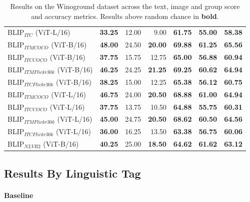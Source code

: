 \begin{table}[ht]
\begin{tabular}{l|rrr|rrr}
 BLIP$_{ITC}$ (ViT-L/16)             & \textbf{33.25} & 12.00          & 9.00           & \textbf{61.75} & \textbf{55.00} & \textbf{58.38} \\
 BLIP$_{ITM COCO}$ (ViT-B/16)        & \textbf{48.00} & 24.50          & \textbf{20.00} & \textbf{69.88} & \textbf{61.25} & \textbf{65.56} \\
 BLIP$_{ITC COCO}$ (ViT-B/16)        & \textbf{37.75} & 15.75          & 12.75          & \textbf{65.00} & \textbf{56.88} & \textbf{60.94} \\
 BLIP$_{ITM Flickr30k}$ (ViT-B/16)   & \textbf{46.25} & 24.25          & \textbf{21.25} & \textbf{69.25} & \textbf{60.62} & \textbf{64.94} \\
 BLIP$_{ITC Flickr30k}$ (ViT-B/16)   & \textbf{38.25} & 15.00          & 12.25          & \textbf{65.38} & \textbf{56.12} & \textbf{60.75} \\
 BLIP$_{ITM COCO}$ (ViT-L/16)        & \textbf{46.75} & 24.00          & \textbf{20.50} & \textbf{68.88} & \textbf{61.00} & \textbf{64.94} \\
 BLIP$_{ITC COCO}$ (ViT-L/16)        & \textbf{37.75} & 13.75          & 10.50          & \textbf{64.88} & \textbf{55.75} & \textbf{60.31} \\
 BLIP$_{ITM Flickr30k}$ (ViT-L/16)   & \textbf{45.00} & 24.75          & \textbf{20.50} & \textbf{68.62} & \textbf{60.50} & \textbf{64.56} \\
 BLIP$_{ITC Flickr30k}$ (ViT-L/16)   & \textbf{36.00} & 16.25          & 13.50          & \textbf{63.38} & \textbf{56.75} & \textbf{60.06} \\
 BLIP$_{NLVR2}$ (ViT-B/16)           & \textbf{40.25} & 25.00          & \textbf{18.50} & \textbf{64.62} & \textbf{61.62} & \textbf{63.12} \\
\bottomrule
\end{tabular}
\caption{Results on the Winoground dataset across the text, image and group score and accuracy metrics. Results above random chance in \textbf{bold}.}
\label{tab:results_aggr_ours}
\end{table}

\subsection{Results By Linguistic Tag}

\paragraph{Baseline}

